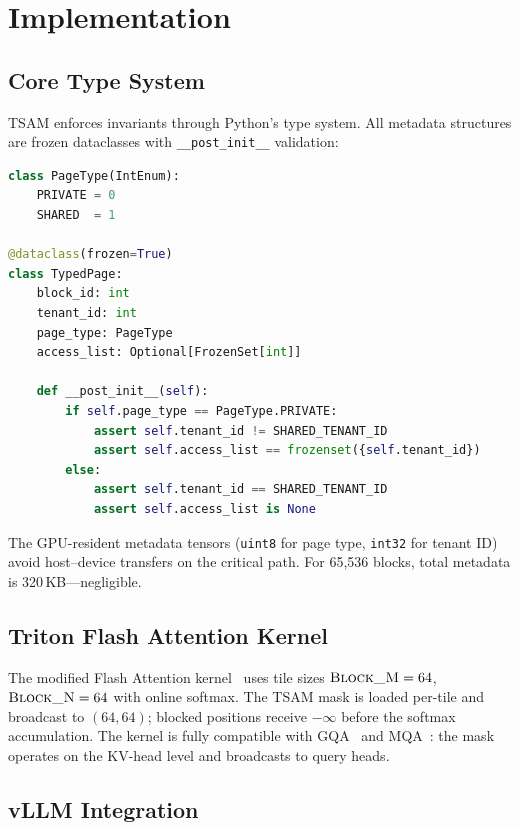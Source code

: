\documentclass[11pt]{article}
\begin{document}
\section{Implementation}
\label{sec:implementation}

\subsection{Core Type System}

TSAM enforces invariants through Python's type system. All metadata structures are frozen dataclasses with \texttt{\_\_post\_init\_\_} validation:

\begin{lstlisting}[language=Python, caption={Core type definitions.}]
class PageType(IntEnum):
    PRIVATE = 0
    SHARED  = 1

@dataclass(frozen=True)
class TypedPage:
    block_id: int
    tenant_id: int
    page_type: PageType
    access_list: Optional[FrozenSet[int]]

    def __post_init__(self):
        if self.page_type == PageType.PRIVATE:
            assert self.tenant_id != SHARED_TENANT_ID
            assert self.access_list == frozenset({self.tenant_id})
        else:
            assert self.tenant_id == SHARED_TENANT_ID
            assert self.access_list is None
\end{lstlisting}

The GPU-resident metadata tensors (\texttt{uint8} for page type, \texttt{int32} for tenant ID) avoid host--device transfers on the critical path. For 65,536 blocks, total metadata is 320\,KB---negligible.

\subsection{Triton Flash Attention Kernel}

The modified Flash Attention kernel~\citep{dao2022flashattention, tillet2019triton} uses tile sizes $\textsc{Block\_M} = 64$, $\textsc{Block\_N} = 64$ with online softmax. The TSAM mask is loaded per-tile and broadcast to $(64, 64)$; blocked positions receive $-\infty$ before the softmax accumulation. The kernel is fully compatible with GQA~\citep{ainslie2023gqa} and MQA~\citep{shazeer2019fast}: the mask operates on the KV-head level and broadcasts to query heads.

\subsection{vLLM Integration}
\end{document}
